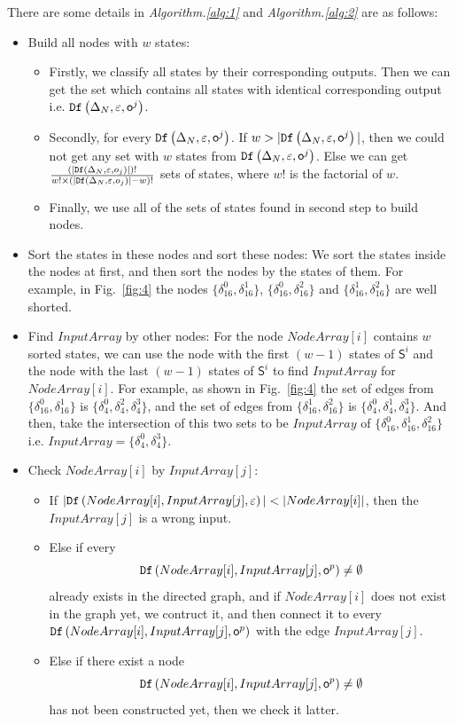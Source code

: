 There are some details in {\em Algorithm.\ref{alg:1}} and {\em Algorithm.\ref{alg:2}} are as follows:
\begin{itemize}
\item Build all nodes with $w$ states:
\begin{itemize}
\item Firstly, we classify all states by their corresponding outputs. Then we can get the set which contains all states with identical corresponding output i.e. ${\tt Df}\left(\Delta_N,\varepsilon,\mathsf{o}^{j}\right)$.
\item Secondly, for every ${\tt Df}\left(\Delta_N,\varepsilon,\mathsf{o}^{j}\right)$. If $w>|{\tt Df}\left(\Delta_N,\varepsilon,\mathsf{o}^{j}\right)|$, then we could not get any set with $w$ states from ${\tt Df}\left(\Delta_N,\varepsilon,\mathsf{o}^{j}\right)$. Else we can get $\frac{(|{\tt Df}\left(\Delta_N,\varepsilon,o_j\right)|)!}{w!\times (|{\tt Df}\left(\Delta_N,\varepsilon,o_j\right)|-w)!}$ sets of states, where $w!$ is the factorial of $w$.
\item Finally, we use all of the sets of states found in second step to build nodes. 
\end{itemize} 
 \item Sort the states in these nodes and sort these nodes: We sort the states inside the nodes at first, and then sort the nodes by the states of them. For example, in Fig.~\ref{fig:4} the nodes $\{\delta_{16}^0,\delta_{16}^1\}$, $\{\delta_{16}^0,\delta_{16}^2\}$ and $\{\delta_{16}^1,\delta_{16}^2\}$ are well shorted. 
  \item Find $InputArray$ by other nodes:
   For the node $NodeArray[i]$ contains $w$ sorted states, we can use the node with the first $(w-1)$ states of $\mathsf{S}^i$ and the node with the last $(w-1)$ states of $\mathsf{S}^i$ to find $InputArray$ for $NodeArray[i]$. For example, as shown in Fig.~\ref{fig:4} the set of edges from $\{\delta_{16}^0,\delta_{16}^1\}$ is $\{\delta_{4}^0,\delta_{4}^2,\delta_{4}^3\}$, and the set of edges from $\{\delta_{16}^1,\delta_{16}^2\}$ is $\{\delta_{4}^0,\delta_{4}^1,\delta_{4}^3\}$. And then, take the intersection of this two sets to be $InputArray$ of $\{\delta_{16}^0,\delta_{16}^1,\delta_{16}^2\}$ i.e. $InputArray=\{\delta_{4}^0,\delta_{4}^3\}$. 
  \item Check $NodeArray[i]$ by $InputArray[j]$:
     
\begin{itemize}
\item If $|\Ded\left(NodeArray[i],InputArray[j],\varepsilon\right)|<|NodeArray[i]|$, then the $InputArray[j]$ is a wrong input.
\item Else if every \[{\tt Df}\left(NodeArray[i],InputArray[j],\mathsf{o}^{p}\right)\ne\emptyset\] already exists in the directed graph, and if $NodeArray[i]$ does not exist in the graph yet, we contruct it, and then connect it to every ${\tt Df}\left(NodeArray[i],InputArray[j],\mathsf{o}^{p}\right)$ with the edge $InputArray[j]$.
\item Else if there exist a node \[{\tt Df}\left(NodeArray[i],InputArray[j],\mathsf{o}^{p}\right)\ne\emptyset\] has not been constructed yet, then we check it latter. 
\end{itemize} 
\end{itemize} 

